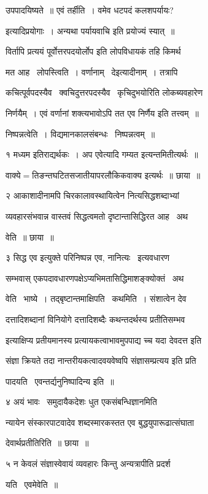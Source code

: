 \documentclass[11pt, openany]{book}
\begin{document}
उपपादयिष्यते~॥ एवं तर्हीति~। वमेव धटपदं कलशपर्यायः? 

इत्यादिप्रयोगाः~। अन्यथा {\qt पर्यायवाचि} इति प्रयोज्यं स्यात्~॥ 

विर्तापि प्रत्ययं पूर्वोत्तरपदयोर्लोप इति लोपविधायकं तहि किमर्थ \textendash\ 

मत आह \textendash\ लोपस्त्विति~। वर्णानाम् \textendash\ {\qt देइत्यादीनाम्~।} तत्रापि 

कचित्पूर्वपदस्यैव \textendash\ क्वचिदुत्तरपदस्यैव \textendash\ कृचिदुभयोरिति लोकब्यवहारेण 

निर्णयैम्~। एवं वर्णानां शक्त्यभावोऽपि तत एव निर्णैय इति तत्त्वम्~॥ 

निष्पन्नत्वेति~। विद्यमानकालसंबन्धः \textendash\ निष्पन्नत्वम्~॥ 



१ मध्यम इतिराद्यर्थकः~। अप एवेत्यादि गम्यत इत्यन्तमितीत्यर्थः~॥ 

वाक्ये$=$तिङन्तघटितसजातीयापरलौकिकवाक्य इत्यर्थः~॥ छाया~॥ 

२ आकाशादीनामपि चिरकालावस्थायित्वेन नित्यसिद्धशब्दाभ्यां 

व्यवहारसंभवान्न वास्तवं सिद्धत्वमतो दृष्टान्तासिद्धिरत आह \textendash\ अथ \textendash\ 

वेति~॥ छाया~॥ 

३ {\qt सिद्ध एव} इत्युक्ते परिनिष्पन्न एव, नानित्यः \textendash\ इत्यवधारण \textendash\ 

सम्भवास् एकपदावधारणपक्षेऽप्यभिमतासिद्धिमाशङ्क्योक्तं \textendash\ अथ \textendash\ 

वेति \textendash\ भाष्ये~। तद्बृष्टान्तमाक्षिपति \textendash\ कथमिति~। संशात्वेन देव \textendash\ 

दत्तादिशब्दानां विनियोगे दत्तादिशब्दैः कथन्तदर्थस्य प्रतीतिसम्भव 

इत्याक्षिप्य प्रतीयमानस्य प्रत्यायकत्वाभावमुपपाद्य च्च यदा देवदत्त इति


संज्ञा क्रियते तदा नान्तरीयकत्वादवयवेष्वपि संज्ञासम्प्रत्यय इति प्रति \textendash\ 


पादयति \textendash\ एवन्तर्द्यनुनिष्पादिन्य इति~॥ 

४ अयं भावः \textendash\ समुदायैकदेशः धुत एकसंबन्धिज्ञानमिति 

न्यायेन संस्कारपाटवादेव शब्दस्मारकस्तत एव बुद्धयुपारूढात्संघाता \textendash\ 

देवार्थप्रतीतिरिति~॥ छाया~॥ 

५ न केवलं संज्ञास्वेवायं व्यवहारः किन्तु अन्यत्रापीति प्रदर्श \textendash\ 

यति \textendash\ एवमेवेति~॥ 
\end{document}
